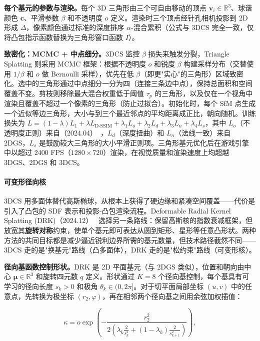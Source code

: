 \textbf{每个基元的参数与渲染。}每个 3D 三角形由三个可自由移动的顶点 $\mathbf{v}_i \in \mathbb{R}^3$、球谐颜色 $\mathbf{c}$、平滑参数 $\beta$ 和不透明度 $o$ 定义。渲染时三个顶点经针孔相机投影到 2D 形成 $\Delta$，像素颜色通过标准的深度排序 $\alpha$-混合累积（公式与 3DCS 完全一致，仅将凸包指示函数替换为三角形窗口函数 $I$）。

\textbf{致密化：MCMC + 中点细分。}3DCS 监控 $\beta$ 损失来触发分裂，Triangle Splatting 则采用 MCMC 框架：根据不透明度 $o$ 和锐度 $\beta$ 构建采样分布（交替使用 $1/\beta$ 和 $o$ 做 Bernoulli 采样），优先在低 $\beta$（即更"实心"的三角形）区域致密化。选中的三角形通过中点细分一分为四（连接三条边中点），保持总面积和空间覆盖不变。剪枝则移除最大混合权重低于阈值 $\tau_p$ 的三角形，以及仅在一个视角中渲染且覆盖不超过一个像素的三角形（防止过拟合）。初始化时，每个 SfM 点生成一个近似等边三角形，大小与到三个最近邻点的平均距离成正比，朝向随机。训练损失为 $L = (1-\lambda)L_1 + \lambda L_{\text{D-SSIM}} + \lambda_1 L_o + \lambda_2 L_d + \lambda_3 L_n + \lambda_4 L_s$，其中 $L_o$（不透明度正则）来自（2024.04）~\cite{2404_09591}，$L_d$（深度扭曲）和 $L_n$（法线一致）来自 2DGS，$L_s$ 是鼓励较大三角形的大小平滑正则项。三角形基元优化后在游戏引擎中以超过 2400 FPS（$1280\times720$）渲染，在视觉质量和渲染速度上均超越 3DGS、2DGS 和 3DCS。

\paragraph{可变形径向核}

3DCS 用多面体替代高斯椭球，从根本上获得了硬边缘和紧凑空间覆盖——代价是引入了凸包的 SDF 表示和投影-凸包渲染流程。Deformable Radial Kernel Splatting (DRK)（2024.12）~\cite{2412_11752} 选择另一条路线：保留高斯核的指数衰减框架，但放宽其\textbf{旋转对称}约束，使单个基元即可表达从圆到矩形、星形等任意凸形状。两种方法的共同目标都是减少逼近锐利边界所需的基元数量，但技术路径截然不同——3DCS 走的是"换基元"路线（凸多面体），DRK 走的是"松约束"路线（可变形核）。

\textbf{径向基函数控制形状。}DRK 是 2D 平面基元（与 2DGS 类似），位置和朝向由中心 $\boldsymbol{\mu} \in \mathbb{R}^3$ 和旋转四元数 $q$ 定义。形状通过 $K=8$ 个径向基控制，每个基具有可学习的径向长度 $s_k > 0$ 和极角 $\theta_k \in (0, 2\pi]$。对于切平面局部坐标 $(u,v)$ 中的任意点，先转换为极坐标 $(r_2, \varphi)$，再在相邻两个径向基之间用余弦加权插值：

\begin{equation}
    \kappa = o \exp\!\left(-\frac{r_2^2}{2\left(\lambda_k \frac{2}{s_k^2} + (1-\lambda_k)\frac{2}{s_{k+1}^2}\right)}\right),
\end{equation}

